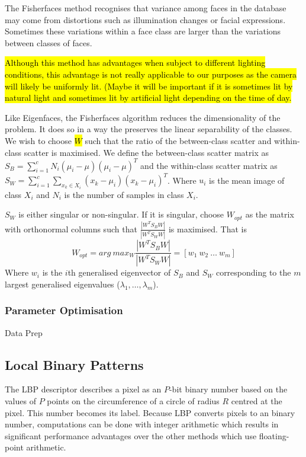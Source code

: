 \documentclass{article}
\begin{document}
The Fisherfaces method recognises that variance among faces in the database may come from distortions such as illumination changes or facial expressions. Sometimes these variations within a face class are larger than the variations between classes of faces.

\hl{Although this method has advantages when subject to different lighting conditions, this advantage is not really applicable to our purposes as the camera will likely be uniformly lit. (Maybe it will be important if it is sometimes lit by natural light and sometimes lit by artificial light depending on the time of day.}

Like Eigenfaces, the Fisherfaces algorithm reduces the dimensionality of the problem. It does so in a way the preserves the linear separability of the classes. We wish to choose \hl{$W$} such that the ratio of the between-class scatter and within-class scatter is maximised. We define the between-class scatter matrix as $S_B = \sum_{i=1}^{c}N_i(\mu_i - \mu)(\mu_i - \mu)^T$ and the within-class scatter matrix as  $S_W = \sum_{i=1}^{c}\sum_{x_k\in X_i}(x_k - \mu_i)(x_k - \mu_i)^T$. Where $u_i$ is the mean image of class $X_i$ and $N_i$ is the number of samples in class $X_i$.

$S_W$ is either singular or non-singular. If it is singular, choose $W_{opt}$ as the matrix with orthonormal columns such that $\frac{|W^TS_BW|}{|W^TS_WW|}$ is maximised. That is
\begin{equation}
	W_{opt} = arg\ max_W \frac{|W^TS_BW|}{|W^TS_WW|} = [w_1\ w_2\ \ldots\ w_m]
\end{equation}
Where $w_i$ is the $i$th generalised eigenvector of $S_B$ and $S_W$ corresponding to the $m$ largest generalised eigenvalues ($\lambda_1, \ldots, \lambda_m$).

\subsubsection{Parameter Optimisation}
Data Prep

\subsection{Local Binary Patterns}
The LBP descriptor describes a pixel as an $P$-bit binary number based on the values of $P$ points on the circumference of a circle of radius $R$ centred at the pixel. This number becomes its label.
Because LBP converts pixels to an binary number, computations can be done with integer arithmetic which results in significant performance advantages over the other methods which use floating-point arithmetic.
\end{document}
